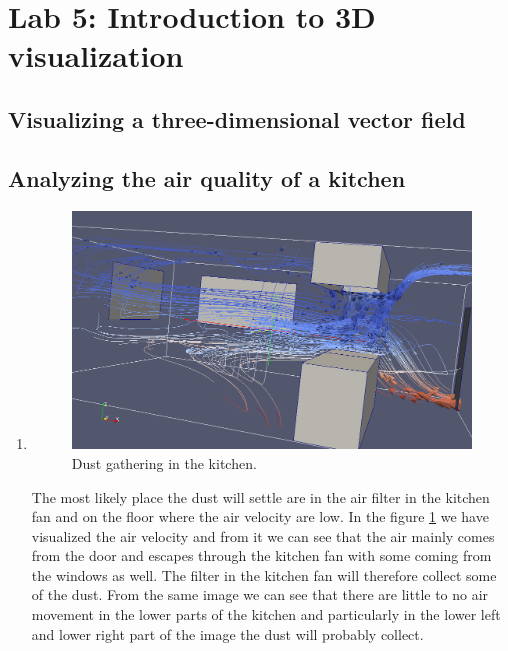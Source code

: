\documentclass[a4paper]{article}
\begin{document}
\section{Lab 5: Introduction to 3D visualization}

\subsection{Visualizing a three-dimensional vector field}

\subsection{Analyzing the air quality of a kitchen}

\begin{enumerate}
    \item
        \begin{figure}[H]
            \includegraphics[width=1\linewidth]{lab5/kitchen-dust-screenshot.png}
            \caption{Dust gathering in the kitchen.}
            \label{fig:dust}
        \end{figure}
        The most likely place the dust will settle are in the air filter in the
        kitchen fan and on the floor where the air velocity are low. In the
        figure \ref{fig:dust} we have visualized the air velocity and from it we can see
        that the air mainly comes from the door and escapes through the kitchen
        fan with some coming from the windows as well. The filter in the kitchen
        fan will therefore collect some of the dust. From the same image we can
        see that there are little to no air movement in the lower parts of the
        kitchen and particularly in the lower left and lower right part of the
        image the dust will probably collect.

\end{enumerate}
\end{document}
